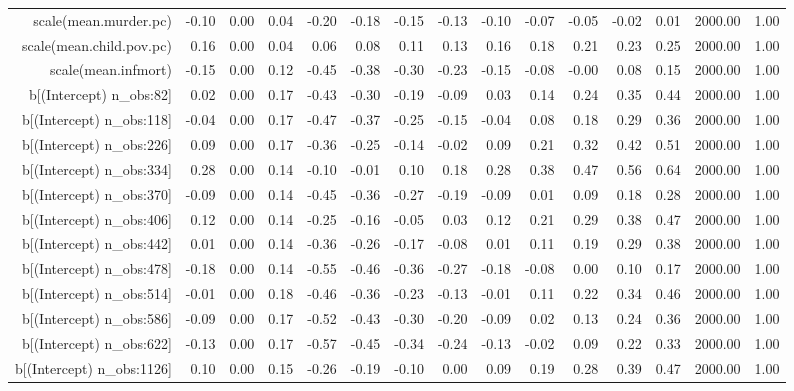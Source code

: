 \begin{table}[ht]
\begin{tabular}{rrrrrrrrrrrrrrr}
  scale(mean.murder.pc) & -0.10 & 0.00 & 0.04 & -0.20 & -0.18 & -0.15 & -0.13 & -0.10 & -0.07 & -0.05 & -0.02 & 0.01 & 2000.00 & 1.00 \\ 
  scale(mean.child.pov.pc) & 0.16 & 0.00 & 0.04 & 0.06 & 0.08 & 0.11 & 0.13 & 0.16 & 0.18 & 0.21 & 0.23 & 0.25 & 2000.00 & 1.00 \\ 
  scale(mean.infmort) & -0.15 & 0.00 & 0.12 & -0.45 & -0.38 & -0.30 & -0.23 & -0.15 & -0.08 & -0.00 & 0.08 & 0.15 & 2000.00 & 1.00 \\ 
  b[(Intercept) n\_obs:82] & 0.02 & 0.00 & 0.17 & -0.43 & -0.30 & -0.19 & -0.09 & 0.03 & 0.14 & 0.24 & 0.35 & 0.44 & 2000.00 & 1.00 \\ 
  b[(Intercept) n\_obs:118] & -0.04 & 0.00 & 0.17 & -0.47 & -0.37 & -0.25 & -0.15 & -0.04 & 0.08 & 0.18 & 0.29 & 0.36 & 2000.00 & 1.00 \\ 
  b[(Intercept) n\_obs:226] & 0.09 & 0.00 & 0.17 & -0.36 & -0.25 & -0.14 & -0.02 & 0.09 & 0.21 & 0.32 & 0.42 & 0.51 & 2000.00 & 1.00 \\ 
  b[(Intercept) n\_obs:334] & 0.28 & 0.00 & 0.14 & -0.10 & -0.01 & 0.10 & 0.18 & 0.28 & 0.38 & 0.47 & 0.56 & 0.64 & 2000.00 & 1.00 \\ 
  b[(Intercept) n\_obs:370] & -0.09 & 0.00 & 0.14 & -0.45 & -0.36 & -0.27 & -0.19 & -0.09 & 0.01 & 0.09 & 0.18 & 0.28 & 2000.00 & 1.00 \\ 
  b[(Intercept) n\_obs:406] & 0.12 & 0.00 & 0.14 & -0.25 & -0.16 & -0.05 & 0.03 & 0.12 & 0.21 & 0.29 & 0.38 & 0.47 & 2000.00 & 1.00 \\ 
  b[(Intercept) n\_obs:442] & 0.01 & 0.00 & 0.14 & -0.36 & -0.26 & -0.17 & -0.08 & 0.01 & 0.11 & 0.19 & 0.29 & 0.38 & 2000.00 & 1.00 \\ 
  b[(Intercept) n\_obs:478] & -0.18 & 0.00 & 0.14 & -0.55 & -0.46 & -0.36 & -0.27 & -0.18 & -0.08 & 0.00 & 0.10 & 0.17 & 2000.00 & 1.00 \\ 
  b[(Intercept) n\_obs:514] & -0.01 & 0.00 & 0.18 & -0.46 & -0.36 & -0.23 & -0.13 & -0.01 & 0.11 & 0.22 & 0.34 & 0.46 & 2000.00 & 1.00 \\ 
  b[(Intercept) n\_obs:586] & -0.09 & 0.00 & 0.17 & -0.52 & -0.43 & -0.30 & -0.20 & -0.09 & 0.02 & 0.13 & 0.24 & 0.36 & 2000.00 & 1.00 \\ 
  b[(Intercept) n\_obs:622] & -0.13 & 0.00 & 0.17 & -0.57 & -0.45 & -0.34 & -0.24 & -0.13 & -0.02 & 0.09 & 0.22 & 0.33 & 2000.00 & 1.00 \\ 
  b[(Intercept) n\_obs:1126] & 0.10 & 0.00 & 0.15 & -0.26 & -0.19 & -0.10 & 0.00 & 0.09 & 0.19 & 0.28 & 0.39 & 0.47 & 2000.00 & 1.00 \\ 

\end{tabular}
\end{table}
